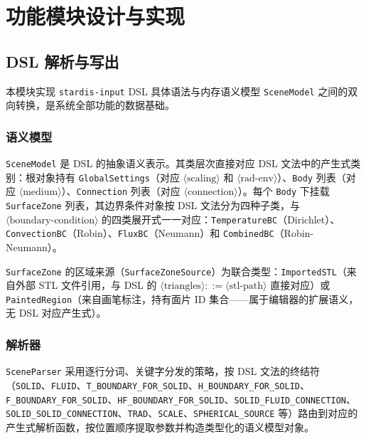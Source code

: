 \section{功能模块设计与实现}
\label{sec:gui:modules}

\subsection{DSL 解析与写出}
\label{sec:gui:parser}

本模块实现 \texttt{stardis-input} DSL 具体语法与内存语义模型 \texttt{SceneModel} 之间的双向转换，是系统全部功能的数据基础。

\subsubsection{语义模型}

\texttt{SceneModel} 是 DSL 的抽象语义表示。其类层次直接对应 DSL 文法中的产生式类别：根对象持有 \texttt{GlobalSettings}（对应 $\langle\text{scaling}\rangle$ 和 $\langle\text{rad-env}\rangle$）、\texttt{Body} 列表（对应 $\langle\text{medium}\rangle$）、\texttt{Connection} 列表（对应 $\langle\text{connection}\rangle$）。每个 \texttt{Body} 下挂载 \texttt{SurfaceZone} 列表，其边界条件对象按 DSL 文法分为四种子类，与 $\langle\text{boundary-condition}\rangle$ 的四类展开式一一对应：\texttt{TemperatureBC}（Dirichlet）、\texttt{ConvectionBC}（Robin）、\texttt{FluxBC}（Neumann）和 \texttt{CombinedBC}（Robin-Neumann）。

\texttt{SurfaceZone} 的区域来源（\texttt{SurfaceZoneSource}）为联合类型：\texttt{ImportedSTL}（来自外部 STL 文件引用，与 DSL 的 $\langle\text{triangles}\rangle ::= \langle\text{stl-path}\rangle$ 直接对应）或 \texttt{PaintedRegion}（来自画笔标注，持有面片 ID 集合——属于编辑器的扩展语义，无 DSL 对应产生式）。

\subsubsection{解析器}

\texttt{SceneParser} 采用逐行分词、关键字分发的策略，按 DSL 文法的终结符（\texttt{SOLID}、\texttt{FLUID}、\texttt{T\_BOUNDARY\_\linebreak[0]FOR\_SOLID}、\texttt{H\_BOUNDARY\_FOR\_SOLID}、\texttt{F\_BOUNDARY\_FOR\_SOLID}、\texttt{HF\_BOUNDARY\_\linebreak[0]FOR\_SOLID}、\texttt{SOLID\_FLUID\_CONNECTION}、\texttt{SOLID\_SOLID\_CONNECTION}、\texttt{TRAD}、\texttt{SCALE}、\texttt{SPHERICAL\_SOURCE} 等）路由到对应的产生式解析函数，按位置顺序提取参数并构造类型化的语义模型对象。

